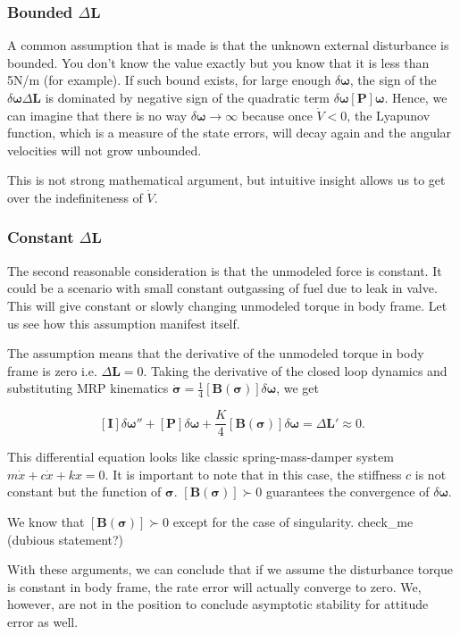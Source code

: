 \documentclass{article}
\begin{document}
\subsubsection*{Bounded $\Delta\bm{L}$}
A common assumption that is made is that the unknown external disturbance is bounded. You don't know the value exactly but you know that it is less than 5N/m (for example). If such bound exists, for large enough $\delta\bm{\omega}$, the sign of the $\delta\bm{\omega}\Delta\bm{L}$ is dominated by negative sign of the quadratic term $\delta\bm{\omega}[\bm{P}]\bm{\omega}$. Hence, we can imagine that there is no way $\delta\bm{\omega}\rightarrow\infty$ because once $\dot{V}<0$, the Lyapunov function, which is a measure of the state errors, will decay again and the angular velocities will not grow unbounded.

This is not strong mathematical argument, but intuitive insight allows us to get over the indefiniteness of $\dot{V}$.

\subsubsection*{Constant $\Delta\bm{L}$}
The second reasonable consideration is that the unmodeled force is constant. It could be a scenario with small constant outgassing of fuel due to leak in valve. This will give constant or slowly changing unmodeled torque in body frame. Let us see how this assumption manifest itself.

The assumption means that the derivative of the unmodeled torque in body frame is zero i.e. $\Delta\bm{L}=0$. Taking the derivative of the closed loop dynamics and substituting MRP kinematics $\dot{\bm{\sigma}}=\frac{1}{4}[\bm{B}(\bm{\sigma})]\delta\bm{\omega}$, we get

$$
  [\bm{I}]\delta\bm{\omega}''+[\bm{P}]\delta\bm{\omega}+\frac{K}{4}[\bm{B}(\bm{\sigma})]\delta\bm{\omega}=\Delta\bm{L}'\approx0.
$$

This differential equation looks like classic spring-mass-damper system $m\dot{x}+c\dot{x}+kx=0$. It is important to note that in this case, the stiffness $c$ is not constant but the function of $\bm{\sigma}$. $[\bm{B}(\bm{\sigma})]\succ0$ guarantees the convergence of $\delta\bm{\omega}$.

We know that $[\bm{B}(\bm{\sigma})]\succ0$ except for the case of singularity. check\_me (dubious statement?)

With these arguments, we can conclude that if we assume the disturbance torque is constant in body frame, the rate error will actually converge to zero. We, however, are not in the position to conclude asymptotic stability for attitude error as well.
\end{document}
